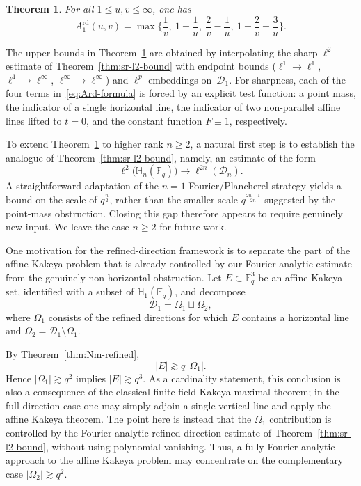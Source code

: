 \documentclass[11pt]{article}
\newtheorem{theorem}{Theorem}[section]
\newcommand{\F}{\mathbb{F}}
\newcommand{\1}{\mathbf 1}
\begin{document}
\begin{theorem}\label{thm:exact-rd}
For all $1\le u,v\le\infty$, one has
\begin{equation}\label{eq:Ard-formula}
A^{\mathrm{rd}}_1(u,v)
=
\max\Bigg\{\frac1v,\ 1-\frac1u,\ \frac{2}{v}-\frac1u,\ 1+\frac{2}{v}-\frac{3}{u}\Bigg\}.
\end{equation}
\end{theorem}


The upper bounds in Theorem~\ref{thm:exact-rd} are obtained by interpolating the sharp $\ell^2$ estimate of Theorem~\ref{thm:sr-l2-bound} with endpoint bounds ($\ell^1\to\ell^1$, $\ell^1\to\ell^\infty$, $\ell^\infty\to\ell^\infty$) and $\ell^p$ embeddings on~$\mathcal{D}_1$. For sharpness, each of the four terms in~\eqref{eq:Ard-formula} is forced by an explicit test function: a point mass, the indicator of a single horizontal line, the indicator of two non-parallel affine lines lifted to $t=0$, and the constant function $F\equiv 1$, respectively.


To extend Theorem~\ref{thm:exact-rd} to higher rank $n\ge 2$, a natural first step is to establish the analogue of Theorem~\ref{thm:sr-l2-bound}, namely, an estimate of the form
\[
\ell^2\bigl(\mathbb H_n(\F_q)\bigr)\longrightarrow \ell^{2n}(\mathcal D_n).
\]
A straightforward adaptation of the $n=1$ Fourier/Plancherel strategy yields a bound on the scale of $q^{\frac n2}$, rather than the smaller scale $q^{\frac{2n-1}{2n}}$ suggested by the point-mass obstruction. Closing this gap therefore appears to require genuinely new input. {  We leave the case $n\ge 2$ for future work.}

{  One motivation for the refined-direction framework is to
separate the part of the affine Kakeya problem that is already
controlled by our Fourier-analytic estimate from the genuinely
non-horizontal obstruction. Let
$E\subset\mathbb F_q^3$ be an affine Kakeya set, identified
with a subset of $\mathbb H_1(\mathbb F_q)$, and decompose
\[
\mathcal D_1=\Omega_1\sqcup\Omega_2,
\]
where $\Omega_1$ consists of the refined directions for which
$E$ contains a horizontal line and
$\Omega_2=\mathcal D_1\setminus\Omega_1$.

By Theorem~\ref{thm:Nm-refined},
\[
|E|\gtrsim q\,|\Omega_1|.
\]
Hence $|\Omega_1|\gtrsim q^2$ implies $|E|\gtrsim q^3$.
As a cardinality statement, this conclusion is also a
consequence of the classical finite field Kakeya maximal
theorem; in the full-direction case one may simply adjoin a
single vertical line and apply the affine Kakeya theorem.
The point here is instead that the $\Omega_1$ contribution is
controlled by the Fourier-analytic refined-direction estimate
of Theorem~\ref{thm:sr-l2-bound}, without using polynomial
vanishing. Thus, a fully Fourier-analytic approach to the
affine Kakeya problem may concentrate on the complementary
case $|\Omega_2|\gtrsim q^2$.}
\end{document}
